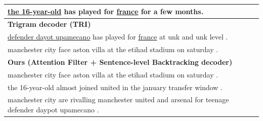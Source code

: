 \documentclass{nle}
\theoremstyle{definition}
\begin{document}
\begin{table}[th!]
\begin{center}
\begin{tabular}{|l|}
			\underline{the 16-year-old} has played for \underline{france}  for a few months.\\ 
			\hline \bf Trigram decoder (TRI) \\
			\hline \underline{defender dayot upamecano} has played for \underline{france} at unk and unk level .\\ 
			manchester city face aston villa at the etihad stadium on saturday . \\
			\hline \bf Ours (Attention Filter + Sentence-level Backtracking decoder) \\
			\hline manchester city face aston villa at the etihad stadium on saturday . \\
			the 16-year-old almost joined united in the january transfer window . \\
			manchester city are rivalling manchester united and arsenal for teenage defender daypot upamecano .\\
			\hline
		\end{tabular}
	\end{center}
\end{table}
\end{document}
